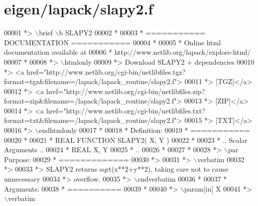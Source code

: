 \hypertarget{eigen_2lapack_2slapy2_8f_source}{}\section{eigen/lapack/slapy2.f}
\label{eigen_2lapack_2slapy2_8f_source}

\begin{DoxyCode}
00001 \textcolor{comment}{*> \(\backslash\)brief \(\backslash\)b SLAPY2}
00002 \textcolor{comment}{*}
00003 \textcolor{comment}{*  =========== DOCUMENTATION ===========}
00004 \textcolor{comment}{*}
00005 \textcolor{comment}{* Online html documentation available at }
00006 \textcolor{comment}{*            http://www.netlib.org/lapack/explore-html/ }
00007 \textcolor{comment}{*}
00008 \textcolor{comment}{*> \(\backslash\)htmlonly}
00009 \textcolor{comment}{*> Download SLAPY2 + dependencies }
00010 \textcolor{comment}{*> <a
       href="http://www.netlib.org/cgi-bin/netlibfiles.tgz?format=tgz&filename=/lapack/lapack\_routine/slapy2.f"> }
00011 \textcolor{comment}{*> [TGZ]</a> }
00012 \textcolor{comment}{*> <a
       href="http://www.netlib.org/cgi-bin/netlibfiles.zip?format=zip&filename=/lapack/lapack\_routine/slapy2.f"> }
00013 \textcolor{comment}{*> [ZIP]</a> }
00014 \textcolor{comment}{*> <a
       href="http://www.netlib.org/cgi-bin/netlibfiles.txt?format=txt&filename=/lapack/lapack\_routine/slapy2.f"> }
00015 \textcolor{comment}{*> [TXT]</a>}
00016 \textcolor{comment}{*> \(\backslash\)endhtmlonly }
00017 \textcolor{comment}{*}
00018 \textcolor{comment}{*  Definition:}
00019 \textcolor{comment}{*  ===========}
00020 \textcolor{comment}{*}
00021 \textcolor{comment}{*       REAL             FUNCTION SLAPY2( X, Y )}
00022 \textcolor{comment}{* }
00023 \textcolor{comment}{*       .. Scalar Arguments ..}
00024 \textcolor{comment}{*       REAL               X, Y}
00025 \textcolor{comment}{*       ..}
00026 \textcolor{comment}{*  }
00027 \textcolor{comment}{*}
00028 \textcolor{comment}{*> \(\backslash\)par Purpose:}
00029 \textcolor{comment}{*  =============}
00030 \textcolor{comment}{*>}
00031 \textcolor{comment}{*> \(\backslash\)verbatim}
00032 \textcolor{comment}{*>}
00033 \textcolor{comment}{*> SLAPY2 returns sqrt(x**2+y**2), taking care not to cause unnecessary}
00034 \textcolor{comment}{*> overflow.}
00035 \textcolor{comment}{*> \(\backslash\)endverbatim}
00036 \textcolor{comment}{*}
00037 \textcolor{comment}{*  Arguments:}
00038 \textcolor{comment}{*  ==========}
00039 \textcolor{comment}{*}
00040 \textcolor{comment}{*> \(\backslash\)param[in] X}
00041 \textcolor{comment}{*> \(\backslash\)verbatim}

\end{DoxyCode}
